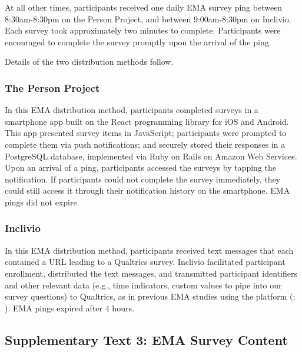 \documentclass[
]{article}
\begin{document}
At all other times, participants received one daily EMA survey ping
between 8:30am-8:30pm on the Person Project, and between 9:00am-8:30pm
on Inclivio. Each survey took approximately two minutes to complete.
Participants were encouraged to complete the survey promptly upon the
arrival of the ping.

Details of the two distribution methods follow.

\subsubsection*{The Person Project}\label{the-person-project}

In this EMA distribution method, participants completed surveys in a
smartphone app built on the React programming library for iOS and
Android. This app presented survey items in JavaScript; participants
were prompted to complete them via push notifications; and securely
stored their responses in a PostgreSQL database, implemented via Ruby on
Rails on Amazon Web Services. Upon an arrival of a ping, participants
accessed the surveys by tapping the notification. If participants could
not complete the survey immediately, they could still access it through
their notification history on the smartphone. EMA pings did not expire.

\subsubsection*{Inclivio}\label{inclivio}

In this EMA distribution method, participants received text messages
that each contained a URL leading to a Qualtrics survey. Inclivio
facilitated participant enrollment, distributed the text messages, and
transmitted participant identifiers and other relevant data (e.g., time
indicators, custom values to pipe into our survey questions) to
Qualtrics, as in previous EMA studies using the platform
(;
). EMA pings expired after 4
hours.

\subsection*{Supplementary Text 3: EMA Survey
Content}\label{supplementary-text-3-ema-survey-content}
\end{document}
